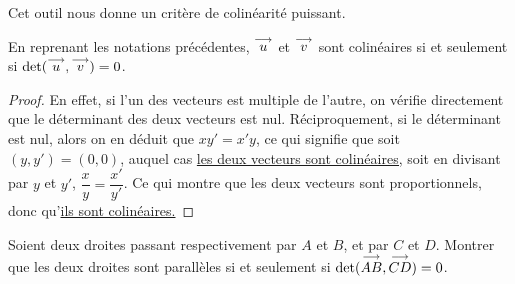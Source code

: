 Cet outil nous donne un critère de colinéarité puissant.

\begin{prop}
    En reprenant les notations précédentes, $\overset{\longrightarrow}{u}$ et $\overset{\longrightarrow}{v}$ sont colinéaires si et seulement si $\det(\overset{\longrightarrow}{u},\overset{\longrightarrow}{v})=0$.
\end{prop}
\begin{proof}
    En effet, si l'un des vecteurs est multiple de l'autre, on vérifie directement que le déterminant des deux vecteurs est nul. Réciproquement, si le déterminant est nul, alors on en déduit que $xy'=x'y$, ce qui signifie que soit $(y,y')=(0,0)$, auquel cas \underline{les deux vecteurs sont colinéaires,} soit en divisant par $y$ et $y'$, $\dfrac{x}{y}=\dfrac{x'}{y'}$. Ce qui montre que les deux vecteurs sont proportionnels, donc qu'\underline{ils sont colinéaires.}
\end{proof}

\begin{exo}
    Soient deux droites passant respectivement par $A$ et $B$, et par $C$ et $D$. Montrer que les deux droites sont parallèles si et seulement si $\det(\overset{\longrightarrow}{AB},\overset{\longrightarrow}{CD})=0$.
\end{exo}


\newpage